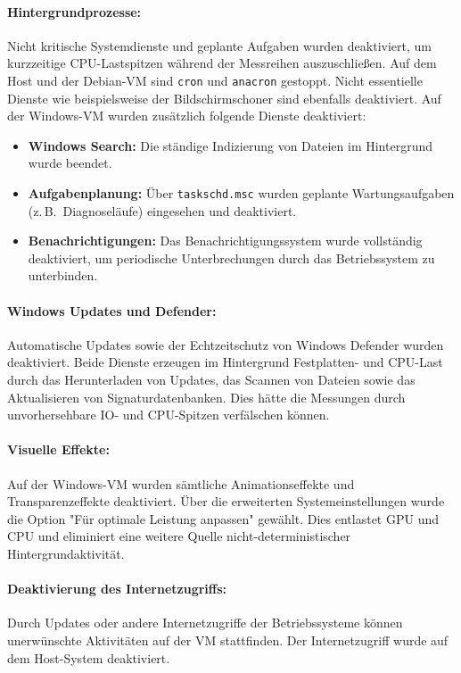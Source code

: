 \begin{sloppypar}
\paragraph{Hintergrundprozesse:}
Nicht kritische Systemdienste und geplante Aufgaben wurden deaktiviert,
um kurzzeitige \acs{CPU}-Lastspitzen während der Messreihen auszuschließen.
Auf dem Host und der Debian-\acs{VM} sind \texttt{cron} und \texttt{anacron} gestoppt.
Nicht essentielle Dienste wie beispielsweise der Bildschirmschoner sind ebenfalls deaktiviert.
Auf der Windows-\acs{VM} wurden zusätzlich folgende Dienste deaktiviert:
\begin{itemize}
    \item \textbf{Windows Search:} Die ständige Indizierung von Dateien im Hintergrund wurde beendet.
    \item \textbf{Aufgabenplanung:} Über \texttt{taskschd.msc} wurden geplante Wartungsaufgaben
    (z.\,B.~Diagnoseläufe) eingesehen und deaktiviert.
    \item \textbf{Benachrichtigungen:} Das Benachrichtigungssystem wurde vollständig deaktiviert,
    um periodische Unterbrechungen durch das Betriebssystem zu unterbinden.
\end{itemize}

\paragraph{Windows Updates und Defender:}
Automatische Updates sowie der Echtzeitschutz von Windows Defender wurden deaktiviert.
Beide Dienste erzeugen im Hintergrund Festplatten- und \acs{CPU}-Last durch das Herunterladen von Updates,
das Scannen von Dateien sowie das Aktualisieren von Signaturdatenbanken.
Dies hätte die Messungen durch unvorhersehbare \acs{IO}- und \acs{CPU}-Spitzen verfälschen können.

\paragraph{Visuelle Effekte:}
Auf der Windows-\acs{VM} wurden sämtliche Animationseffekte und Transparenzeffekte deaktiviert.
Über die erweiterten Systemeinstellungen wurde die Option
"Für optimale Leistung anpassen" gewählt.
Dies entlastet \acs{GPU} und \acs{CPU} und eliminiert eine weitere Quelle nicht-deterministischer Hintergrundaktivität.

\paragraph{Deaktivierung des Internetzugriffs:}
Durch Updates oder andere Internetzugriffe der Betriebssysteme können unerwünschte Aktivitäten auf der \acs{VM} stattfinden.
Der Internetzugriff wurde auf dem Host-System deaktiviert.



\end{sloppypar}
